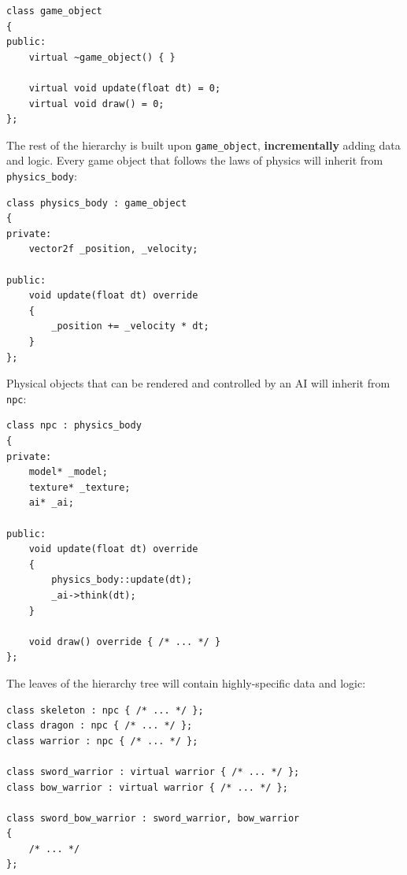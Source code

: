 \documentclass[twoside, 12pt, a4paper, openany]{book}
\begin{document}
\begin{verbatim}
class game_object
{
public:
    virtual ~game_object() { }

    virtual void update(float dt) = 0;
    virtual void draw() = 0;
};
\end{verbatim}

The rest of the hierarchy is built upon
\texttt{game_object},
\textbf{incrementally} adding data and logic. Every game object that
follows the laws of physics will inherit from
\texttt{physics_body}:

\begin{verbatim}
class physics_body : game_object
{
private:
    vector2f _position, _velocity;

public:
    void update(float dt) override
    {
        _position += _velocity * dt;
    }
};
\end{verbatim}

Physical objects that can be rendered and controlled by an AI will
inherit from
\texttt{npc}:

\begin{verbatim}
class npc : physics_body
{
private:
    model* _model;
    texture* _texture;
    ai* _ai;

public:
    void update(float dt) override
    {
        physics_body::update(dt);
        _ai->think(dt);
    }

    void draw() override { /* ... */ }
};
\end{verbatim}

The leaves of the hierarchy tree will contain highly-specific data and
logic:

\begin{verbatim}
class skeleton : npc { /* ... */ };
class dragon : npc { /* ... */ };
class warrior : npc { /* ... */ };

class sword_warrior : virtual warrior { /* ... */ };
class bow_warrior : virtual warrior { /* ... */ };

class sword_bow_warrior : sword_warrior, bow_warrior
{
    /* ... */
};
\end{verbatim}
\end{document}

